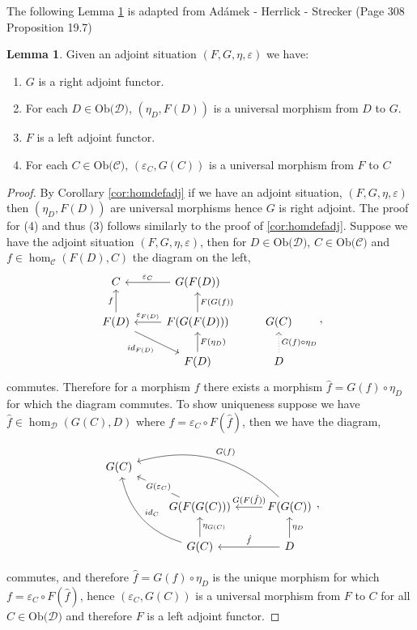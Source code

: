 \documentclass[11pt,a4paper]{article}
\theoremstyle{definition}
\newtheorem{lemma}[thm]{Lemma}
\newcommand\ho[3][]{\hom_{#1}(#2,#3)}
\newcommand\ob[1]{\mathrm{Ob(}#1\mathrm{)}}
\newcommand\cat[1]{\mathscr{#1}}
\numberwithin{equation}{section}
\begin{document}
The following Lemma \ref{lem:dualityofadjoints} is adapted from Adámek - Herrlick - Strecker \cite{ACC} (Page 308 Proposition 19.7)
\begin{lemma}
    \label{lem:dualityofadjoints}
    Given an adjoint situation $(F,G,\eta,\varepsilon)$ we have:
    \begin{enumerate}
        \item $G$ is a right adjoint functor.
        \item For each $D\in\ob{\cat{D}}$, $(\eta_{D},F(D))$ is a universal morphism from $D$ to $G$.
        \item $F$ is a left adjoint functor.
        \item For each $C\in\ob{\cat{C}}$, $(\varepsilon_{C},G(C))$ is a universal morphism from $F$ to $C$
    \end{enumerate}
\end{lemma}
\begin{proof}
    By Corollary \ref{cor:homdefadj} if we have an adjoint situation, $(F,G,\eta,\varepsilon)$ then $(\eta_{D},F(D))$ are universal morphisms hence $G$ is right adjoint. The proof for (4) and thus (3) follows similarly to the proof of \ref{cor:homdefadj}. Suppose we have the adjoint situation $(F,G,\eta,\varepsilon)$, then for $D\in\ob{\cat{D}}$, $C\in\ob{\cat{C}}$ and $f\in\ho[\cat{C}]{F(D)}{C}$ the diagram on the left,
    \begin{equation*}
    \begin{tikzcd}
    C \arrow[d, "f"',leftarrow] \arrow[r , "\varepsilon_{C}",leftarrow] & G(F(D)) \arrow[d,"F(G(f))",leftarrow] \\
    F(D) \arrow[r, "\varepsilon_{F(D)}",leftarrow] \arrow[dr, "id_{F(D)}"'] & F(G(F(D))) \arrow[d, "F(\eta_{D})",leftarrow] & G(C) \arrow[d,"G(f)\circ\eta_{D}", dotted,leftarrow] \\
    & F(D) & D
    \end{tikzcd},
    \end{equation*}
    commutes. Therefore for a morphism $f$ there exists a morphism $\hat{f}= G(f)\circ\eta_{D}$ for which the diagram commutes. To show uniqueness suppose we have $\hat{f}\in\ho[\cat{D}]{G(C)}{D}$ where $f = \varepsilon_{C}\circ F(\hat{f})$, then we have the diagram,
    
    \begin{equation*}
    \begin{tikzcd}
    G(C)\arrow[drr,"G(f)",bend left,leftarrow] \arrow[ddr,bend right,leftarrow,"id_{C}"] \arrow[dr,leftarrow,"G(\varepsilon_{C})"description] & & \\
    & G(F(G(C))) \arrow[r,leftarrow,"G(F(\hat{f}))"] \arrow[d,leftarrow,"\eta_{G(C)}"] & F(G(C)) \arrow[d,leftarrow,"\eta_{D}"] \\ & G(C) \arrow[r,leftarrow,"\hat{f}"] & D
    \end{tikzcd},
    \end{equation*}
    
    commutes, and therefore $\hat{f}= G(f)\circ\eta_{D}$ is the unique morphism for which $f = \varepsilon_{C}\circ F(\hat{f})$, hence $(\varepsilon_{C},G(C))$ is a universal morphism from $F$ to $C$ for all $C\in\ob{\cat{D}}$ and therefore $F$ is a left adjoint functor.
\end{proof}
\end{document}
